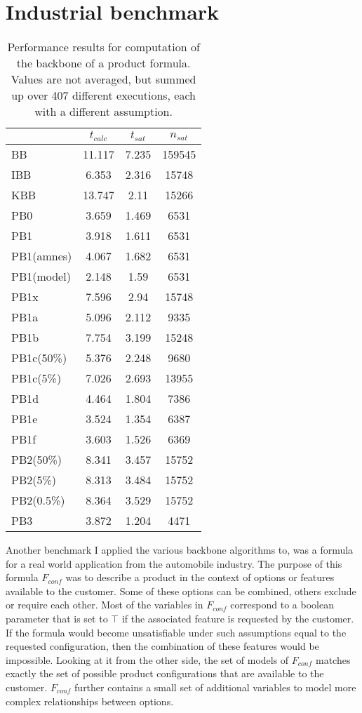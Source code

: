 \section{Industrial benchmark}
\label{sec:sectionVonThore}

\begin{wraptable}[29]{r}{7cm}
\begin{tabular}{l| c c c }
&$t_{calc}$ & $t_{sat}$& $n_{sat}$ \\
\hline
BB & 11.117 & 7.235 & 159545 \\
IBB & 6.353 & 2.316 & 15748 \\
KBB & 13.747 & 2.11 & 15266 \\
PB0 & 3.659 & 1.469 & 6531 \\
PB1 & 3.918 & 1.611 & 6531 \\
PB1(amnes) & 4.067 & 1.682 & 6531 \\
PB1(model) & 2.148 & 1.59 & 6531 \\
PB1x & 7.596 & 2.94 & 15748 \\
PB1a & 5.096 & 2.112 & 9335 \\
PB1b & 7.754 & 3.199 & 15248 \\
PB1c(50\%) & 5.376 & 2.248 & 9680 \\
PB1c(5\%) & 7.026 & 2.693 & 13955 \\
PB1d & 4.464 & 1.804 & 7386 \\
PB1e & 3.524 & 1.354 & 6387 \\
PB1f & 3.603 & 1.526 & 6369 \\
PB2(50\%) & 8.341 & 3.457 & 15752 \\
PB2(5\%) & 8.313 & 3.484 & 15752 \\
PB2(0.5\%) & 8.364 & 3.529 & 15752 \\
PB3 & 3.872 & 1.204 & 4471 \\
\end{tabular}
\caption{Performance results for computation of the backbone of a product formula. Values are not averaged, but summed up over 407 different executions, each with a different assumption.}
\label{tab:vonThore1}
\end{wraptable}

Another benchmark I applied the various backbone algorithms to, was a formula for a real world application from the automobile industry. The purpose of this formula $F_{conf}$ was to describe a product in the context of options or features available to the customer. Some of these options can be combined, others exclude or require each other. Most of the variables in $F_{conf}$ correspond to a boolean parameter that is set to $\top$ if the associated feature is requested by the customer. If the formula would become unsatisfiable under such assumptions equal to the requested configuration, then the combination of these features would be impossible. Looking at it from the other side, the set of models of $F_{conf}$ matches exactly the set of possible product configurations that are available to the customer. $F_{conf}$ further contains a small set of additional variables to model more complex relationships between options.

